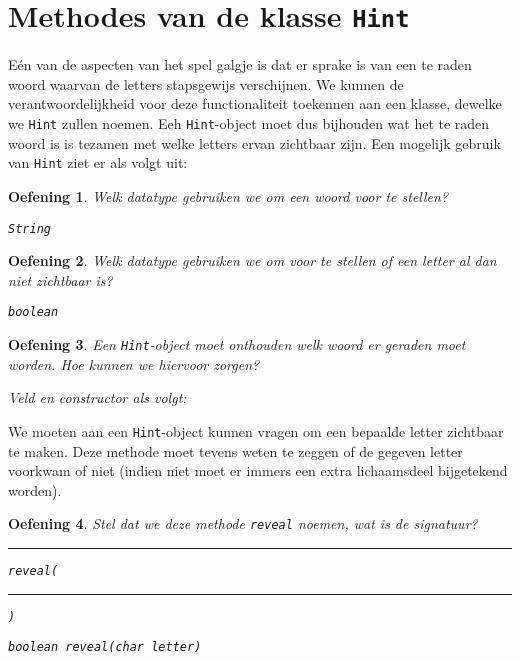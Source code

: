 \documentclass[a4paper,dutch]{article}
\newtheorem{exercise}{Oefening}[section]
\newcommand{\code}[2][]{
  
}
\begin{document}

\section{Methodes van de klasse {\tt Hint}}
E\'en van de aspecten van het spel galgje is dat er sprake is van een te raden woord
waarvan de letters stapsgewijs verschijnen.
We kunnen de verantwoordelijkheid
voor deze functionaliteit toekennen aan een klasse, dewelke we {\tt Hint} zullen noemen.
Eeh {\tt Hint}-object moet dus bijhouden wat het te raden woord is is tezamen met welke letters ervan zichtbaar zijn.
Een mogelijk gebruik van {\tt Hint} ziet er als volgt uit:
\code{hint-interaction.java}

\begin{exercise}
Welk datatype gebruiken we om een woord voor te stellen?
\begin{solution}
\tt String
\end{solution}
\end{exercise}

\begin{exercise}\label{exercise:field}
Welk datatype gebruiken we om voor te stellen of een letter al dan niet zichtbaar is?
\begin{solution}
\tt boolean
\end{solution}
\end{exercise}

\begin{exercise}
Een {\tt Hint}-object moet onthouden welk woord er geraden moet worden. Hoe kunnen we hiervoor zorgen?
\begin{solution}
Veld en constructor als volgt:
\code{hint-field-constructor.java}
\end{solution}
\end{exercise}

We moeten aan een {\tt Hint}-object kunnen vragen om een bepaalde letter zichtbaar te maken.
Deze methode moet tevens weten te zeggen of de gegeven letter voorkwam of niet (indien niet
moet er immers een extra lichaamsdeel bijgetekend worden).

\begin{exercise}
Stel dat we deze methode {\tt reveal} noemen, wat is de signatuur?
\begin{center}
  \rule{2cm}{.5pt} {\tt reveal(}\rule{4cm}{.5pt}{\tt)}
\end{center}
\begin{solution}
\tt boolean reveal(char letter)
\end{solution}
\end{exercise}
\end{document}
